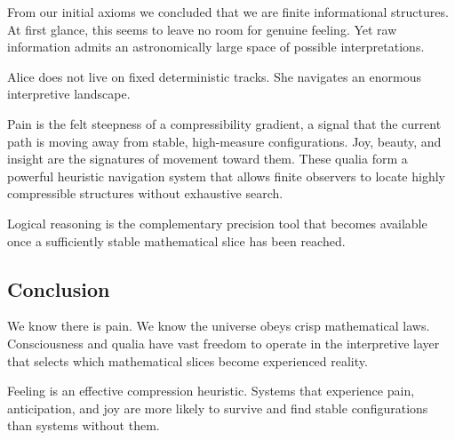 From our initial axioms we concluded that we are finite informational structures.
At first glance, this seems to leave no room for genuine feeling.
Yet raw information admits an astronomically large space of possible interpretations.

Alice does not live on fixed deterministic tracks. She navigates an enormous interpretive landscape. 

Pain is the felt steepness of a compressibility gradient, a signal that the current path is moving away from stable, high-measure configurations.
Joy, beauty, and insight are the signatures of movement toward them.
These qualia form a powerful heuristic navigation system that allows finite observers to locate highly compressible structures without exhaustive search.

Logical reasoning is the complementary precision tool that becomes available once a sufficiently stable mathematical slice has been reached.

\subsection*{Conclusion}

We know there is pain.
We know the universe obeys crisp mathematical laws.
Consciousness and qualia have vast freedom to operate in the interpretive layer that selects which mathematical slices become experienced reality.

Feeling is an effective compression heuristic. Systems that experience pain, anticipation, and joy are more likely to survive and find stable configurations than systems without them.

